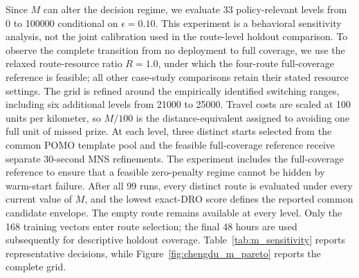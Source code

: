 \documentclass[preprint,12pt,authoryear]{elsarticle}
\theoremstyle{definition}
\begin{document}
{Since $M$ can alter the decision regime, we evaluate 33 policy-relevant levels from 0 to 100000 conditional on $\epsilon=0.10$. 
This experiment is a behavioral sensitivity analysis, not the joint calibration used in the route-level holdout comparison. 
To observe the complete transition from no deployment to full coverage, we use the relaxed route-resource ratio $R=1.0$, under which the four-route full-coverage reference is feasible; 
all other case-study comparisons retain their stated resource settings. 
The grid is refined around the empirically identified switching ranges, including six additional levels from 21000 to 25000. 
Travel costs are scaled at 100 units per kilometer, so $M/100$ is the distance-equivalent assigned to avoiding one full unit of missed prize. 
At each level, three distinct starts selected from the common POMO template pool and the feasible full-coverage reference receive separate 30-second MNS refinements. 
The experiment includes the full-coverage reference to ensure that a feasible zero-penalty regime cannot be hidden by warm-start failure. 
After all 99 runs, every distinct route is evaluated under every current value of $M$, and the lowest exact-DRO score defines the reported common candidate envelope. 
The empty route remains available at every level. 
Only the 168 training vectors enter route selection; the final 48 hours are used subsequently for descriptive holdout coverage. 
Table~\ref{tab:m_sensitivity} reports representative decisions, while Figure~\ref{fig:chengdu_m_pareto} reports the complete grid.

\begin{table}[htbp]
\centering
\caption{Representative best-known decisions from the 33-level conditional sensitivity analysis of $M$ at $\epsilon=0.10$ and relaxed route-resource ratio $R=1.0$.}
\label{tab:m_sensitivity}
\small
{}
\end{table}

}
\end{document}

